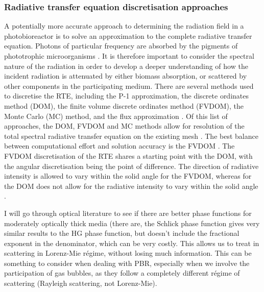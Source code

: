 \subsubsection{Radiative transfer equation discretisation approaches}
\label{S:2.3.2}
A potentially more accurate approach to determining the radiation field in a photobioreactor is to solve an approximation to the complete radiative transfer equation. Photons of particular frequency are absorbed by the pigments of phototrophic microorganisms \cite{McDermott1995}. It is therefore important to consider the spectral nature of the radiation in order to develop a deeper understanding of how the incident radiation is attenuated by either biomass absorption, or scattered by other components in the participating medium. There are several methods used to discretise the RTE, including the P-1 approximation, the discrete ordinates method (DOM), the finite volume discrete ordinates method (FVDOM), the Monte Carlo (MC) method, and the flux approximation \cite{Coelho2008}. Of this list of approaches, the DOM, FVDOM and MC methods allow for resolution of the total spectral radiative transfer equation on the existing mesh \cite{Kong2014}. The best balance between computational effort and solution accuracy is the FVDOM \cite{Modest2003,Kong2014} . The FVDOM discretisation of the RTE shares a starting point with the DOM, with the angular discretisation being the point of difference. The direction of radiative intensity is allowed to vary within the solid angle for the FVDOM, whereas for the DOM does not allow for the radiative intensity to vary within the solid angle \cite{Coelho2014}.

I will go through optical literature to see if there are better phase functions for moderately optically thick media (there are, the Schlick phase function gives very similar results to the HG phase function, but doesn't include the fractional exponent in the denominator, which can be very costly. This allows us to treat in scattering in Lorenz-Mie r\'{e}gime, without losing much information. This can be something to consider when dealing with PBR, especially when we involve the participation of gas bubbles, as they follow a completely different r\'{e}gime of scattering (Rayleigh scattering, not Lorenz-Mie).

